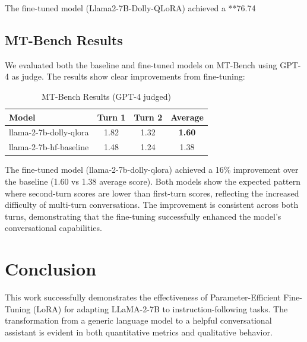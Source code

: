 \documentclass{assignment7_report}
\begin{document}
The fine-tuned model (Llama2-7B-Dolly-QLoRA) achieved a **76.74%

\subsection{MT-Bench Results}

We evaluated both the baseline and fine-tuned models on MT-Bench using GPT-4 as judge. The results show clear improvements from fine-tuning:

\begin{table}[h!]
\centering
\caption{MT-Bench Results (GPT-4 judged)}
\label{tab:mt_bench_results}
\begin{tabular}{@{}lccc@{}}
\toprule
\textbf{Model} & \textbf{Turn 1} & \textbf{Turn 2} & \textbf{Average} \\ \midrule
llama-2-7b-dolly-qlora & 1.82 & 1.32 & \textbf{1.60} \\
llama-2-7b-hf-baseline & 1.48 & 1.24 & 1.38 \\ \bottomrule
\end{tabular}
\end{table}

The fine-tuned model (llama-2-7b-dolly-qlora) achieved a 16\% improvement over the baseline (1.60 vs 1.38 average score). Both models show the expected pattern where second-turn scores are lower than first-turn scores, reflecting the increased difficulty of multi-turn conversations. The improvement is consistent across both turns, demonstrating that the fine-tuning successfully enhanced the model's conversational capabilities.


\section{Conclusion}
\vspace*{-3mm}

This work successfully demonstrates the effectiveness of Parameter-Efficient Fine-Tuning (LoRA) for adapting LLaMA-2-7B to instruction-following tasks. The transformation from a generic language model to a helpful conversational assistant is evident in both quantitative metrics and qualitative behavior.
\end{document}
